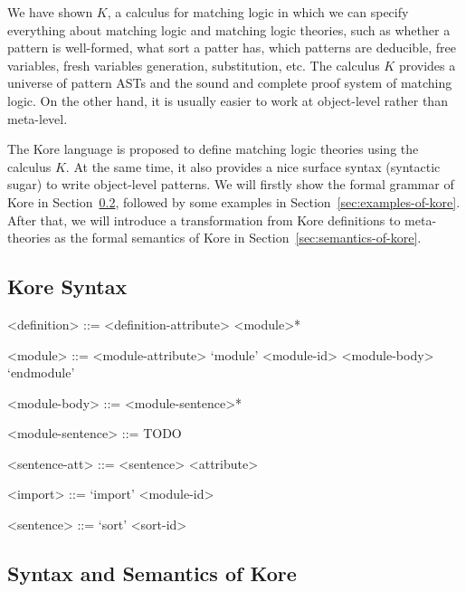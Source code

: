 \documentclass[UTF8]{article}
\theoremstyle{plain}
\theoremstyle{definition}
\theoremstyle{remark}
\begin{document}
We have shown $K$, a calculus for matching logic in which we can specify 
everything about matching logic and matching logic theories, such as 
whether a pattern is well-formed, what sort a patter has, which patterns are 
deducible, free variables, fresh variables generation, substitution, etc.
The calculus $K$ provides a universe of pattern ASTs and the sound and complete 
proof system of matching logic. 
On the other hand, it is usually easier to work at object-level rather than 
meta-level. 

The Kore language is proposed to define matching logic theories using the 
calculus $K$. 
At the same time, it also provides a nice surface syntax 
(syntactic sugar) to write object-level patterns. 
We will firstly show the formal grammar of Kore in 
Section~\ref{sec:syntax-of-kore}, followed by some examples in 
Section~\ref{sec:examples-of-kore}.
After that, we will introduce a transformation from Kore definitions to 
meta-theories as the formal semantics of Kore in 
Section~\ref{sec:semantics-of-kore}.

\subsection{Kore Syntax}

\begin{grammar}\small	
	<definition>    ::= <definition-attribute> <module>*
	
	<module>       ::= <module-attribute> `module' <module-id> <module-body> `endmodule'
	
	<module-body>  ::= <module-sentence>*
	
	<module-sentence> ::= TODO
	
	<sentence-att> ::= <sentence> <attribute>
	
	<import>       ::= `import' <module-id>
	
	<sentence>     ::= `sort' <sort-id>
	
\end{grammar}

\subsection{Syntax and Semantics of Kore}
\label{sec:syntax-of-kore}
\end{document}
